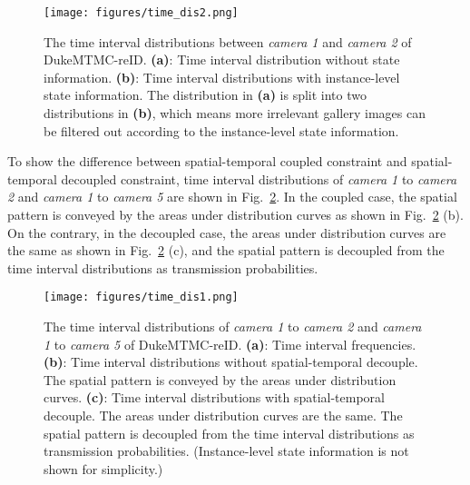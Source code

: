 \documentclass[10pt,twocolumn,letterpaper]{article}
\begin{document}
\begin{figure}[t]
\begin{center}
   \texttt{[image: figures/time\_dis2.png]}
\end{center}
\vspace{-0.3cm}
   \caption {The time interval distributions between \textit{camera 1} and \textit{camera 2} of DukeMTMC-reID. \textbf{(a)}: Time interval distribution without state information. \textbf{(b)}: Time interval distributions with instance-level state information. The distribution in \textbf{(a)} is split into two distributions in \textbf{(b)}, which means more irrelevant gallery images can be filtered out according to the instance-level state information.}
\label{fig:time_dis2}
\vspace{-0.3cm}
\end{figure}

To show the difference between spatial-temporal coupled constraint and spatial-temporal decoupled constraint, time interval distributions of \textit{camera 1} to \textit{camera 2} and \textit{camera 1} to \textit{camera 5} are shown in Fig.~\ref{fig:time_dis1}. In the coupled case, the spatial pattern is conveyed by the areas under distribution curves as shown in Fig.~\ref{fig:time_dis1} (b). On the contrary, in the decoupled case, the areas under distribution curves are the same  as shown in Fig.~\ref{fig:time_dis1} (c), and the spatial pattern is decoupled from the time interval distributions as transmission probabilities.


\begin{figure}[t]
\begin{center}
   \texttt{[image: figures/time\_dis1.png]}
\end{center}
\vspace{-0.3cm}
   \caption {The time interval distributions of \textit{camera 1} to \textit{camera 2} and \textit{camera 1} to \textit{camera 5} of DukeMTMC-reID. \textbf{(a)}: Time interval frequencies. \textbf{(b)}: Time interval distributions without spatial-temporal decouple. The spatial pattern is conveyed by the areas under distribution curves. \textbf{(c)}: Time interval distributions with spatial-temporal decouple. The areas under distribution curves are the same. The spatial pattern is decoupled from the time interval distributions as transmission probabilities. (Instance-level state information is not shown for simplicity.)}
\label{fig:time_dis1}
\vspace{-0.4cm}
\end{figure}
\end{document}
